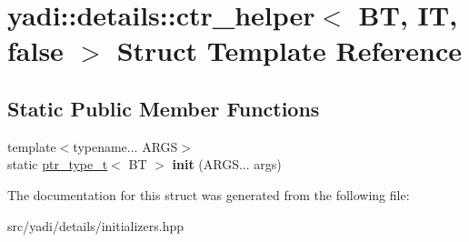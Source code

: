 \hypertarget{structyadi_1_1details_1_1ctr__helper_3_01_b_t_00_01_i_t_00_01false_01_4}{}\section{yadi\+:\+:details\+:\+:ctr\+\_\+helper$<$ BT, IT, false $>$ Struct Template Reference}
\label{structyadi_1_1details_1_1ctr__helper_3_01_b_t_00_01_i_t_00_01false_01_4}
\subsection*{Static Public Member Functions}
\begin{DoxyCompactItemize}
\item 
\mbox{\label{structyadi_1_1details_1_1ctr__helper_3_01_b_t_00_01_i_t_00_01false_01_4_a4a2cfcc0cdaa40eeccc054b8b5fc5dcd}} 
{\footnotesize template$<$typename... A\+R\+GS$>$ }\\static \hyperlink{namespaceyadi_a92290eb27cd90666aa87b17d854af9fe}{ptr\+\_\+type\+\_\+t}$<$ BT $>$ {\bfseries init} (A\+R\+G\+S... args)
\end{DoxyCompactItemize}


The documentation for this struct was generated from the following file\+:\begin{DoxyCompactItemize}
\item 
src/yadi/details/initializers.\+hpp\end{DoxyCompactItemize}
